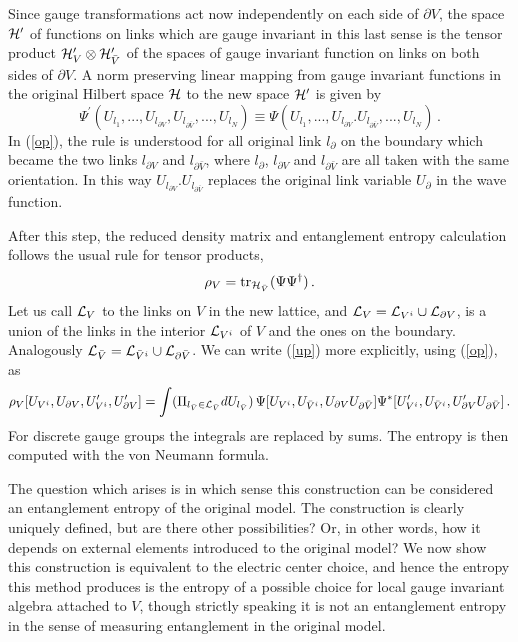 \documentclass[12pt,a4paper]{article}
\newcommand{\be}{\begin{equation}}
\newcommand{\ee}{\end{equation}}
\def\be{\begin{equation}}
\def\ee{\end{equation}}
\begin{document}
 Since gauge transformations act now independently on each side of $\partial V$, the space ${\cal H}^\prime$ of functions on links which 
are gauge invariant in this last sense is the tensor product ${\cal H}^\prime_V\otimes {\cal H}_{\bar{V}}^\prime$ of the spaces of gauge 
invariant function on links on both sides of $\partial V$. A norm preserving linear mapping from gauge invariant functions in the original Hilbert 
space ${\cal H}$ to the new space ${\cal H}^\prime$ is given by
\be
\Psi^\prime(U_{l_1},...,U_{l_{\partial V}},U_{l_{\partial \bar{V}}},...,U_{l_N})\equiv\Psi(U_{l_1},...,U_{l_{\partial V}} . U_{l_{\partial \bar{V}}},...,U_{l_N})\,.\label{op}
\ee    
In (\ref{op}), the rule is understood for all original link $l_\partial$ on the boundary which became the two links $l_{\partial V}$ and $l_{\partial \bar{V}}$, where $l_\partial$, $l_{\partial V}$ and $l_{\partial \bar{V}}$ are all taken with the same orientation. In this way $U_{l_{\partial V}} . U_{l_{\partial \bar{V}}}$ replaces the original link variable $U_\partial$ in the wave function.


After this step, the reduced density matrix and entanglement entropy calculation follows the usual rule for tensor products,
\be
\rho_V=\textrm{tr}_{{\cal H}_{\bar{V}}} (\Psi \Psi^\dagger)\,.\label{up}
\ee
Let us call ${\cal L}_V$ to the links on $V$ in the new lattice, and ${\cal L}_V={\cal L}_{V^i}\cup {\cal L}_{\partial V}$, is a union of the links in the 
interior ${\cal L}_{V^i}$ of $V$ and the ones on the boundary. Analogously ${\cal L}_{\bar{V}}={\cal L}_{\bar{V}^i}\cup {\cal L}_{\partial \bar{V}}$.  We can 
write (\ref{up}) more explicitly, using  (\ref{op}), as
\be
\rho_V[U_{V^i},U_{\partial V},U_{V^i}^\prime,U_{\partial V}^\prime]=\int (\Pi_{l_{\bar{V}}\in {\cal L}_{\bar{V}}} dU_{l_{ \bar{V}}})\,\Psi[U_{V^i},U_{\bar{V}^i},U_{\partial V}U_{\partial \bar{V}} ]\Psi^*[U_{V^i}^\prime,U_{\bar{V}^i},U_{\partial V}^\prime U_{\partial \bar{V}}]\,.\label{episte}
\ee
For discrete gauge groups the integrals are replaced by sums. The entropy is then computed with the von Neumann formula. 


The question which arises is in which sense this construction can be considered an entanglement entropy of the original model. 
The construction is clearly uniquely defined, but are there other possibilities? Or, in other words,  how it depends on external elements 
introduced to the original model? We now show this construction is equivalent to the electric center choice, and hence the entropy 
this method produces is the entropy of a possible choice for local gauge invariant algebra attached to $V$, though strictly speaking it is not an 
entanglement entropy in the sense of measuring entanglement in the original model.
\end{document}
